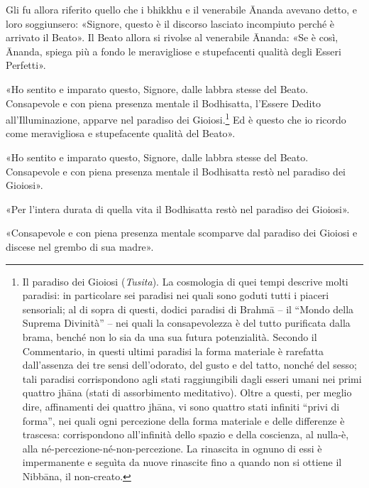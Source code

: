 Gli fu allora riferito quello che i bhikkhu e il venerabile Ānanda
avevano detto, e loro soggiunsero: «Signore, questo è il discorso
lasciato incompiuto perché è arrivato il Beato». Il Beato allora si
rivolse al venerabile Ānanda: «Se è così, Ānanda, spiega più a fondo le
meravigliose e stupefacenti qualità degli Esseri Perfetti».


«Ho sentito e imparato questo, Signore, dalle labbra stesse del Beato.
Consapevole e con piena presenza mentale il Bodhisatta, l’Essere Dedito
all’Illuminazione, apparve nel paradiso dei Gioiosi.\footnote{Il paradiso dei Gioiosi (\emph{Tusita}). La cosmologia di quei tempi descrive molti paradisi: in particolare sei paradisi nei quali sono goduti tutti i piaceri sensoriali; al di sopra di questi, dodici paradisi di Brahmā – il “Mondo della Suprema Divinità” – nei quali la consapevolezza è del tutto purificata dalla brama, benché non lo sia da una sua futura potenzialità. Secondo il Commentario, in questi ultimi paradisi la forma materiale è rarefatta dall’assenza dei tre sensi dell’odorato, del gusto e del tatto, nonché del sesso; tali paradisi corrispondono agli stati raggiungibili dagli esseri umani nei primi quattro jhāna (stati di assorbimento meditativo). Oltre a questi, per meglio dire, affinamenti dei quattro jhāna, vi sono quattro stati infiniti “privi di forma”, nei quali ogni percezione della forma materiale e delle differenze è trascesa: corrispondono all’infinità dello spazio e della coscienza, al nulla-è, alla né-percezione-né-non-percezione. La rinascita in ognuno di essi è impermanente e seguìta da nuove rinascite fino a quando non si ottiene il Nibbāna, il non-creato.} Ed è questo che io ricordo come meravigliosa
e stupefacente qualità del Beato».


«Ho sentito e imparato questo, Signore, dalle labbra stesse del Beato.
Consapevole e con piena presenza mentale il Bodhisatta restò nel
paradiso dei Gioiosi».


«Per l’intera durata di quella vita il Bodhisatta restò nel paradiso dei
Gioiosi».


«Consapevole e con piena presenza mentale scomparve dal paradiso dei
Gioiosi e discese nel grembo di sua madre».


